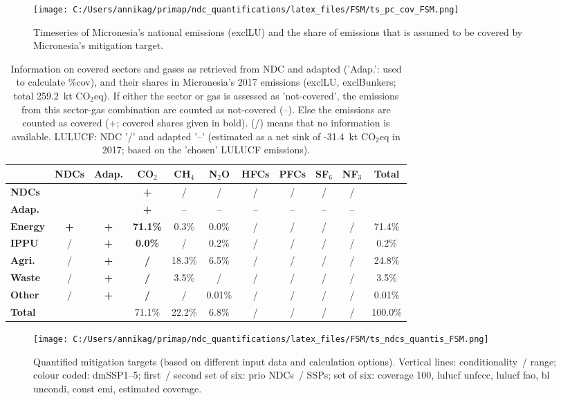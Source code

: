 \documentclass[12pt]{article}
\begin{document}
 \begin{figure}[H]
 \centering
 \texttt{[image: C:/Users/annikag/primap/ndc\_quantifications/latex\_files/FSM/ts\_pc\_cov\_FSM.png]}
 \caption{Timeseries of Micronesia's national emissions (exclLU) and the share of emissions that is assumed to be covered by Micronesia's mitigation target.}
 \label{fig:tsPcCov}
 \end{figure}

 \begin{table}[H]\small
 \centering
 \caption{Information on covered sectors and gases as retrieved from NDC and adapted ('Adap.': used to calculate \%cov), and their shares in Micronesia's 2017 emissions (exclLU, exclBunkers; total 259.2~kt CO$_2$eq).
 If either the sector or gas is assessed as 'not-covered', the emissions from this sector-gas combination are counted as not-covered (--). 
 Else the emissions are counted as covered (+; covered shares given in bold).
 (/) means that no information is available.
 LULUCF: NDC '/' and adapted '--' (estimated as a net sink of -31.4~kt CO$_2$eq in 2017; based on the 'chosen' LULUCF emissions).}
 \label{tab:coveredSectorsGases}
 \begin{tabular}{l || c c || c c c c c c c | c}
 \bfseries  & \bfseries NDCs & \bfseries Adap. & \bfseries CO$_2$ & \bfseries CH$_4$ & \bfseries N$_2$O & \bfseries HFCs & \bfseries PFCs & \bfseries SF$_6$ & \bfseries NF$_3$ & \bfseries Total \tabularnewline \hline \hline
 \bfseries NDCs &  &  & \bfseries + & / & / & / & / & / & / &  \tabularnewline 
 \bfseries Adap. &  &  & \bfseries + & -- & -- & -- & -- & -- & -- &  \tabularnewline \hline \hline
 \bfseries Energy & \bfseries + & \bfseries + & \bfseries 71.1\% & 0.3\% & 0.0\% & / & / & / & / & 71.4\% \tabularnewline 
 \bfseries IPPU & / & \bfseries + & \bfseries 0.0\% & / & 0.2\% & / & / & / & / & 0.2\% \tabularnewline 
 \bfseries Agri. & / & \bfseries + & \bfseries / & 18.3\% & 6.5\% & / & / & / & / & 24.8\% \tabularnewline 
 \bfseries Waste & / & \bfseries + & \bfseries / & 3.5\% & / & / & / & / & / & 3.5\% \tabularnewline 
 \bfseries Other & / & \bfseries + & \bfseries / & / & 0.01\% & / & / & / & / & 0.01\% \tabularnewline \hline
 \bfseries Total &  &  & 71.1\% & 22.2\% & 6.8\% & / & / & / & / & 100.0\% \tabularnewline 
 \end{tabular}
 \end{table}

 \begin{figure}[H]
 \centering
 \texttt{[image: C:/Users/annikag/primap/ndc\_quantifications/latex\_files/FSM/ts\_ndcs\_quantis\_FSM.png]}
 \caption{Quantified mitigation targets (based on different input data and calculation options).
 Vertical lines: conditionality~/ range;
 colour coded: dmSSP1--5;
 first~/ second set of six: prio NDCs~/ SSPs;
 set of six: coverage 100, lulucf unfccc, lulucf fao, bl uncondi, const emi, estimated coverage.}
 \label{fig:miti}
 \end{figure}
\end{document}

